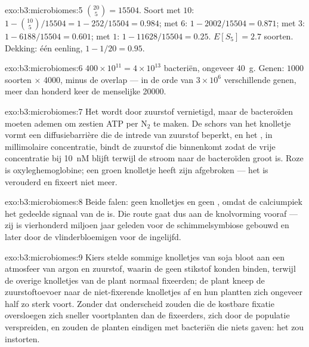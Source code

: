 \begin{solution}{exo:b3:microbiomes:5}
$\binom{20}{5} = \num{15504}$. Soort met $10$: $1 - \binom{10}{5}/
\num{15504} = 1 - 252/\num{15504} = 0.984$; met $6$: $1 - 2002/\num{15504}
= 0.871$; met $3$: $1 - 6188/\num{15504} = 0.601$; met $1$: $1 -
\num{11628}/\num{15504} = 0.25$. $E[S_{5}] = 2.7$ soorten. Dekking: één
eenling, $1 - 1/20 = 0.95$.
\end{solution}

\begin{solution}{exo:b3:microbiomes:6}
$400\times 10^{11} = 4\times 10^{13}$ bacteriën, ongeveer \qty{40}{g}.
Genen: $1000$ soorten $\times$ \num{4000}, minus de overlap --- in de
orde van $3\times 10^{6}$ verschillende genen, meer dan honderd keer de
menselijke \num{20000}.
\end{solution}

\begin{solution}{exo:b3:microbiomes:7}
Het  wordt door zuurstof vernietigd, maar de bacteroïden
moeten ademen om zestien ATP per N$_{2}$ te maken. De schors van het
knolletje vormt een diffusiebarrière die de intrede van zuurstof
beperkt, en het , in millimolaire concentratie, bindt de
zuurstof die binnenkomt zodat de vrije concentratie bij
\qty{10}{nM} blijft terwijl de stroom naar de bacteroïden groot is.
Roze is oxyleghemoglobine; een groen knolletje heeft zijn
 afgebroken --- het is verouderd en fixeert niet meer.
\end{solution}

\begin{solution}{exo:b3:microbiomes:8}
Beide falen: geen knolletjes en geen , omdat de
calciumpiek het gedeelde signaal van de 
is. Die route gaat dus aan de knolvorming vooraf --- zij is
vierhonderd miljoen jaar geleden voor de schimmelsymbiose gebouwd en
later door de vlinderbloemigen voor de  ingelijfd.
\end{solution}

\begin{solution}{exo:b3:microbiomes:9}
Kiers stelde sommige knolletjes van soja bloot aan een atmosfeer van
argon en zuurstof, waarin de  geen stikstof konden binden,
terwijl de overige knolletjes van de plant normaal fixeerden; de plant
kneep de zuurstoftoevoer naar de niet-fixerende knolletjes af en hun
 plantten zich ongeveer half zo sterk voort. Zonder dat
onderscheid zouden  die de kostbare fixatie oversloegen zich
sneller voortplanten dan de fixeerders, zich door de populatie
verspreiden, en zouden de planten eindigen met bacteriën die niets
gaven: het  zou instorten.
\end{solution}

